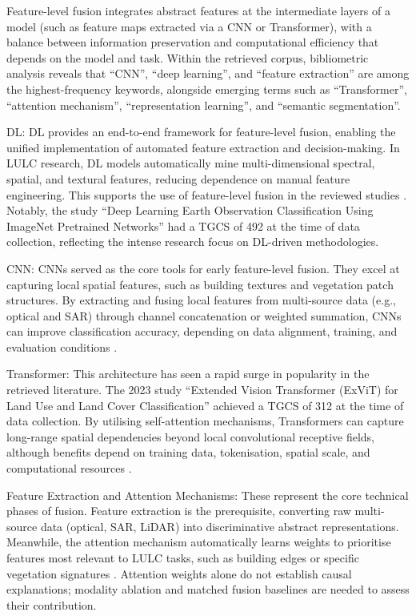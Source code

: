 \documentclass[]{interact}
\theoremstyle{plain}%
\theoremstyle{definition}
\theoremstyle{remark}
\begin{document}
Feature-level fusion integrates abstract features at the intermediate layers of a model (such as feature maps extracted via a CNN or Transformer), with a balance between information preservation and computational efficiency that depends on the model and task. Within the retrieved corpus, bibliometric analysis reveals that ``CNN'', ``deep learning'', and ``feature extraction'' are among the highest-frequency keywords, alongside emerging terms such as ``Transformer'', ``attention mechanism'', ``representation learning'', and ``semantic segmentation''.

DL: DL provides an end-to-end framework for feature-level fusion, enabling the unified implementation of automated feature extraction and decision-making. In LULC research, DL models automatically mine multi-dimensional spectral, spatial, and textural features, reducing dependence on manual feature engineering. This supports the use of feature-level fusion in the reviewed studies \citep{42, 43}. Notably, the study ``Deep Learning Earth Observation Classification Using ImageNet Pretrained Networks'' \citep{28} had a TGCS of 492 at the time of data collection, reflecting the intense research focus on DL-driven methodologies.

\medskip %
CNN: CNNs served as the core tools for early feature-level fusion. They excel at capturing local spatial features, such as building textures and vegetation patch structures. By extracting and fusing local features from multi-source data (e.g., optical and SAR) through channel concatenation or weighted summation, CNNs can improve classification accuracy, depending on data alignment, training, and evaluation conditions \citep{41}.

\medskip
Transformer: This architecture has seen a rapid surge in popularity in the retrieved literature. The 2023 study ``Extended Vision Transformer (ExViT) for Land Use and Land Cover Classification'' \citep{36} achieved a TGCS of 312 at the time of data collection. By utilising self-attention mechanisms, Transformers can capture long-range spatial dependencies beyond local convolutional receptive fields, although benefits depend on training data, tokenisation, spatial scale, and computational resources \citep{45}.

\medskip
Feature Extraction and Attention Mechanisms: These represent the core technical phases of fusion. Feature extraction is the prerequisite, converting raw multi-source data (optical, SAR, LiDAR) into discriminative abstract representations. Meanwhile, the attention mechanism automatically learns weights to prioritise features most relevant to LULC tasks, such as building edges or specific vegetation signatures \citep{46, 47}. Attention weights alone do not establish causal explanations; modality ablation and matched fusion baselines are needed to assess their contribution.
\end{document}
